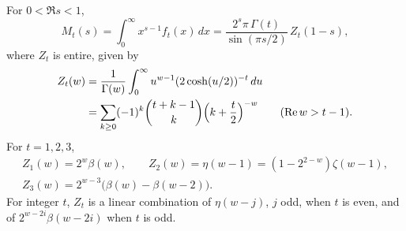 \begin{theorem}\label{lv:thm:meixner}
For $0<\Re s<1$,
\begin{equation}\label{lv:eq:Mt}
M_t(s)=\int_0^\infty x^{s-1}f_t(x)\,dx=\frac{2^s\pi\,\Gamma(t)}{\sin(\pi s/2)}\,Z_t(1-s),
\end{equation}
where $Z_t$ is entire, given by
\begin{align*}
Z_t(w)&=\frac1{\Gamma(w)}\int_0^\infty u^{w-1}(2\cosh(u/2))^{-t}\,du\\
&=\sum_{k\ge0}(-1)^k\binom{t+k-1}{k}\Bigl(k+\frac t2\Bigr)^{-w}\qquad(\Re w>t-1).
\end{align*} For $t=1,2,3$,
\begin{gather*}
Z_1(w)=2^w\beta(w),\qquad Z_2(w)=\eta(w-1)=(1-2^{2-w})\zeta(w-1),\\
Z_3(w)=2^{w-3}\bigl(\beta(w)-\beta(w-2)\bigr).
\end{gather*} For integer $t$, $Z_t$ is a linear combination of $\eta(w-j)$, $j$ odd, when $t$ is even, and of $2^{w-2i}\beta(w-2i)$ when $t$ is odd.
\end{theorem}

